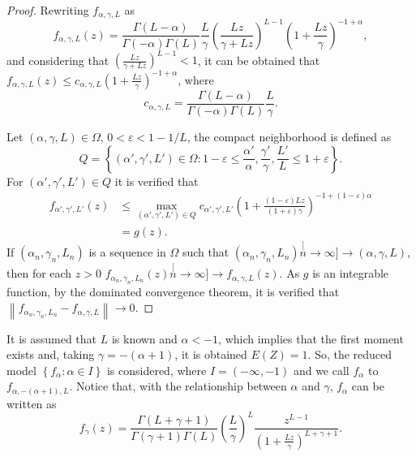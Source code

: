 \documentclass[journal]{IEEEtran}
\numberwithin{equation}{section}
\newenvironment{dem}[1][Proof]{\begin{proof}[{\it #1}]}{\end{proof}}
\newcommand{\norm}[1]{\ensuremath{\left\| #1 \right\|}}
\newcommand{\pa}[1]{\ensuremath{\left( #1 \right)}}
\newcommand{\set}[1]{\ensuremath{\left\{ #1 \right\}}}
\begin{document}
\begin{dem}
	Rewriting $f_{\alpha,\gamma,L}$ as
$$
	f_{\alpha,\gamma,L}\pa{z}= \frac{\Gamma\pa{L-\alpha}}{\Gamma\pa{-\alpha}\Gamma\pa{L}}
	\frac{L}{\gamma}\pa{\frac{Lz}{\gamma+Lz}}^{L-1}
	\pa{1+\frac{Lz}{\gamma}}^{-1+\alpha},
$$
	and considering that $\pa{\frac{Lz}{\gamma+Lz}}^{L-1}<1$, it can be obtained that
	$f_{\alpha,\gamma,L}\pa{z} \le c_{\alpha,\gamma,L} \pa{1+\frac{Lz}{\gamma}}^{-1+\alpha}$, where
$$
	c_{\alpha,\gamma,L} = \frac{\Gamma\pa{L-\alpha}}{\Gamma\pa{-\alpha}\Gamma\pa{L}}
	\frac{L}{\gamma}.
$$
	
	Let $\pa{\alpha,\gamma,L}\in\Omega$, $0<\varepsilon<1-1/L$, 
	the compact neighborhood is defined as
$$
	Q=\set{\pa{\alpha',\gamma',L'}\in\Omega:
		1-\varepsilon\le \textstyle{\frac{\alpha'}{\alpha},\frac{\gamma'}{\gamma},\frac{L'}{L}} \le 1+\varepsilon}.
$$
	For $\pa{\alpha',\gamma',L'}\in Q$ it is verified that %
	\begin{align*}
	f_{\alpha',\gamma',L'}\pa{z} 
	&\le \max\limits_{\pa{\alpha',\gamma',L'}\in Q}c_{\alpha',\gamma',L'}
	\pa{1+\frac{\pa{1-\varepsilon}Lz}{\pa{1+\varepsilon}\gamma}}^{-1+\pa{1-\varepsilon}\alpha} \\
	&= g\pa{z}.
	\end{align*}
	If $\pa{\alpha_{n},\gamma_{n},L_{n}}$ is a sequence in $\Omega$ such that $\pa{\alpha_{n},\gamma_{n},L_{n}}\stackrel[n\to\infty]{}{\longrightarrow}\pa{\alpha,\gamma,L}$, then for each $z>0$
	$f_{\alpha_{n},\gamma_{n},L_{n}}\pa{z}\stackrel[n\to\infty]{}{\longrightarrow} f_{\alpha,\gamma,L}\pa{z}$.
	As $g$ is an integrable function, by the dominated convergence theorem, it is verified that
	$\norm{f_{\alpha_{n},\gamma_{n},L_{n}} - f_{\alpha,\gamma,L}}\to 0$.
\end{dem}

\vspace{0.2cm}

It is assumed that  $L$ is known and $\alpha<-1$, which implies that the first moment exists and, 
taking $\gamma = -\pa{\alpha+1}$, it is obtained $E(Z) = 1$.
So, the reduced model $\set{f_{\alpha}:\alpha\in I}$ is considered,
where $I = \pa{-\infty,-1}\label{I}$ and we call $f_{\alpha}$ to $f_{\alpha,-\pa{\alpha+1},L}$.
Notice that, with the relationship between $\alpha$ and $\gamma$, $f_{\alpha}$ can be written as
\begin{equation}
f_{\gamma}(z)=\frac{\Gamma\pa{L+\gamma+1}}{\Gamma\pa{\gamma+1}\Gamma\pa{L}}
\pa{\frac{L}{\gamma}}^L \frac{z^{L-1}}{\pa{1+\frac{Lz}{\gamma}}^{L+\gamma+1}}.
\label{fgamma}
\end{equation}
\end{document}
